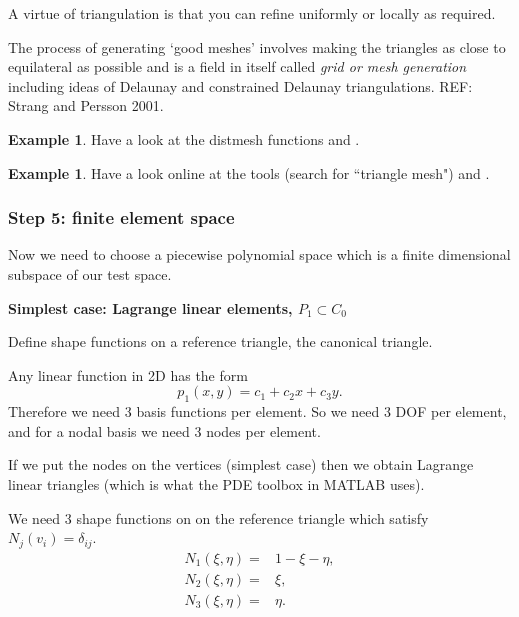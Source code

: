 \documentclass[12pt, a4paper]{article}
\theoremstyle{definition}
\newtheorem{example}[thm]{Example}
\theoremstyle{remark}
\numberwithin{equation}{section}
\begin{document}
A virtue of triangulation is that you can refine uniformly or locally as required.

The process of generating `good meshes' involves making the triangles as close to equilateral as possible and is a field in itself called \emph{grid or mesh generation} including ideas of Delaunay and constrained Delaunay triangulations.
REF: Strang and Persson 2001.

\begin{example}
Have a look at the distmesh functions  and .
\end{example}

\begin{example}
Have a look online at the tools   (search for ``triangle mesh") and .
\end{example}


\newpage

\subsubsection{Step 5: finite element space}

Now we need to choose a piecewise polynomial space which is a finite dimensional subspace of our test space.

\vspace{0.5cm}
{\bf Simplest case: Lagrange linear elements, $P_1 \subset C_0$}

Define shape functions on a reference triangle, the canonical triangle.



Any linear function in 2D has the form 
\begin{equation*}
p_1(x,y)=c_1+c_2x+c_3y.
\end{equation*}
Therefore we need 3 basis functions per element. So we need 3 DOF per element, and for a nodal basis we need 3 nodes per element.

If we put the nodes on the vertices (simplest case) then we obtain Lagrange linear triangles (which is what the PDE toolbox in MATLAB uses).

We need 3 shape functions on on the reference triangle which satisfy \mbox{$N_j(v_i)=\delta_{ij}$}.
\begin{align*}
N_1(\xi,\eta)=&1-\xi-\eta,\\
N_2(\xi,\eta)=&\xi,\\
N_3(\xi,\eta)=&\eta.
\end{align*}
\end{document}
